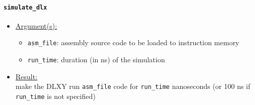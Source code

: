 \paragraph{\texttt{simulate\_dlx}}
\begin{itemize}
	\item \underline{Argument(s):}
		\begin{itemize}
			\item \texttt{asm\_file}: assembly source code to be
				loaded to instruction memory
			\item \texttt{run\_time}: duration (in ns) of the
				simulation
		\end{itemize}
	\item \underline{Result:} \\
		make the DLXY run \texttt{asm\_file} code for \texttt{run\_time}
		nanoseconds (or 100 ns if \texttt{run\_time} is not specified)
\end{itemize}

